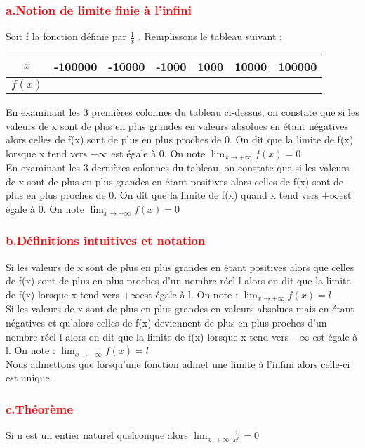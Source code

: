 \documentclass[12pt]{article}
\begin{document}
\subsubsection*{\textcolor{red}{a.Notion de limite finie à l’infini}}
Soit f la fonction définie par $\frac{1}{x}$ . Remplissons le tableau suivant :
\begin{center}
\begin{tabular}{|c|c|c|c|c|c|c|}
\hline
$x$ & -100000 & -10000 & -1000 & 1000& 10000 & 100000 \\
\hline
$f(x)$ & & & & & & \\
\hline
\end{tabular}
\end{center}
En examinant les 3 premières colonnes du tableau ci-dessus, on constate que si les valeurs de x sont de plus en plus grandes en valeurs absolues en étant négatives alors celles de f(x) sont de plus en plus proches de 0. On dit que la limite de f(x) lorsque x tend vers $-\infty$ est égale à 0. On note $\lim_{x \to +\infty}f(x)=0$\\
En examinant les 3 dernières colonnes du tableau, on constate que si les valeurs de x sont de
plus en plus grandes en étant positives alors celles de f(x) sont de plus en plus proches de 0. On dit que la limite de f(x) quand x tend vers $+\infty$est égale à 0. On note 
$\lim_{x \to +\infty}f(x)=0$
\subsubsection*{\textcolor{red}{b.Définitions intuitives et notation}}
Si les valeurs de x sont de plus en plus grandes en étant positives alors que celles de f(x) sont de plus en plus proches d’un nombre réel l alors on dit que la limite de f(x) lorsque x tend vers $+\infty$est égale à l. On note : $\lim_{x \to +\infty}f(x)=l$\\
Si les valeurs de x sont de plus en plus grandes en valeurs absolues mais en étant négatives et qu’alors celles de f(x) deviennent de plus en plus proches d’un nombre réel l alors on dit que la limite de f(x) lorsque x tend vers $-\infty$ est égale à l. On note :
$\lim_{x \to -\infty}f(x)=l$\\
Nous admettons que lorsqu’une fonction admet une limite à l’infini alors celle-ci est unique.
\subsubsection*{\textcolor{red}{c.Théorème}}
Si n est un entier naturel quelconque alors $\lim_{x \to \infty}\frac{1}{x^{n}}=0$
\end{document}
